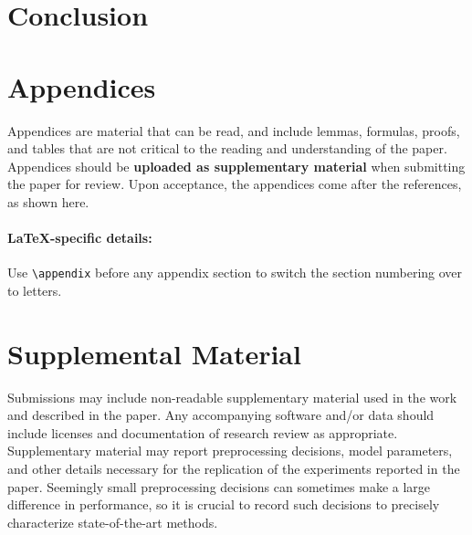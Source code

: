 \documentclass[11pt,a4paper]{article}
\newcommand{\R}{\mathbb{R}}
\begin{document}




\section{Conclusion}




\appendix

\section{Appendices}
\label{sec:appendix}
Appendices are material that can be read, and include lemmas, formulas, proofs, and tables that are not critical to the reading and understanding of the paper. 
Appendices should be \textbf{uploaded as supplementary material} when submitting the paper for review.
Upon acceptance, the appendices come after the references, as shown here.

\paragraph{\LaTeX-specific details:}
Use {\small\verb|\appendix|} before any appendix section to switch the section numbering over to letters.


\section{Supplemental Material}
\label{sec:supplemental}
Submissions may include non-readable supplementary material used in the work and described in the paper.
Any accompanying software and/or data should include licenses and documentation of research review as appropriate.
Supplementary material may report preprocessing decisions, model parameters, and other details necessary for the replication of the experiments reported in the paper.
Seemingly small preprocessing decisions can sometimes make a large difference in performance, so it is crucial to record such decisions to precisely characterize state-of-the-art methods. 
\end{document}
